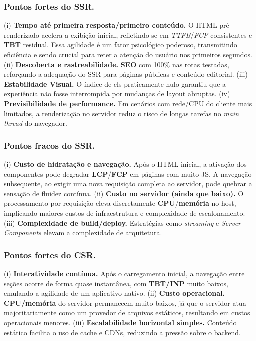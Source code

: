 \subsubsection{Pontos fortes do SSR.}
(i) \textbf{Tempo até primeira resposta/primeiro conteúdo.} O HTML pré-renderizado acelera a exibição inicial, refletindo-se em \textit{TTFB}/\textit{FCP} consistentes e \textbf{TBT} residual. Essa agilidade é um fator psicológico poderoso, transmitindo eficiência e sendo crucial para reter a atenção do usuário nos primeiros segundos.
(ii) \textbf{Descoberta e rastreabilidade.} \textbf{SEO} com 100\% nas rotas testadas, reforçando a adequação do SSR para páginas públicas e conteúdo editorial.
(iii) \textbf{Estabilidade Visual.} O índice de \acrshort{cls} praticamente nulo garantiu que a experiência não fosse interrompida por mudanças de layout abruptas.
(iv) \textbf{Previsibilidade de performance.} Em cenários com rede/CPU do cliente mais limitados, a renderização no servidor reduz o risco de longas tarefas no \emph{main thread} do navegador.

\subsubsection{Pontos fracos do SSR.}
(i) \textbf{Custo de hidratação e navegação.} Após o HTML inicial, a ativação dos componentes pode degradar \textbf{LCP}/\textbf{FCP} em páginas com muito JS. A navegação subsequente, ao exigir uma nova requisição completa ao servidor, pode quebrar a sensação de fluidez contínua.
(ii) \textbf{Custo no servidor (ainda que baixo).} O processamento por requisição eleva discretamente \textbf{CPU}/\textbf{memória} no host, implicando maiores custos de infraestrutura e complexidade de escalonamento.
(iii) \textbf{Complexidade de build/deploy.} Estratégias como \emph{streaming} e \emph{Server Components} elevam a complexidade de arquitetura.

\subsubsection{Pontos fortes do CSR.}
(i) \textbf{Interatividade contínua.} Após o carregamento inicial, a navegação entre seções ocorre de forma quase instantânea, com \textbf{TBT/INP} muito baixos, emulando a agilidade de um aplicativo nativo.
(ii) \textbf{Custo operacional.} \textbf{CPU/memória} do servidor permanecem muito baixos, já que o servidor atua majoritariamente como um provedor de arquivos estáticos, resultando em custos operacionais menores.
(iii) \textbf{Escalabilidade horizontal simples.} Conteúdo estático facilita o uso de cache e CDNs, reduzindo a pressão sobre o backend.

